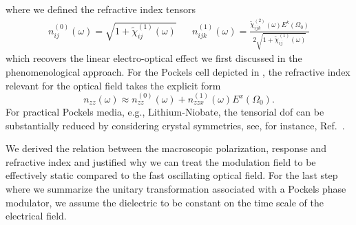 where we defined the refractive index tensors
\begin{align}
	n^{(0)}_{ij}(\omega)
	=
	\sqrt{1+\tilde{\chi}^{(1)}_{ij}(\omega)}
	&&
	n^{(1)}_{ijk}(\omega)
	=
	\frac{\tilde{\chi}^{(2)}_{ijk}(\omega)
	E^k(\Omega_0)}{2\sqrt{1+\tilde{\chi}^{(1)}_{ij}(\omega)}}
\end{align}
which recovers the linear electro-optical effect we first discussed in the phenomenological approach.
For the Pockels cell depicted in , the refractive index relevant for the optical field takes the explicit form
\begin{equation}
	n_{zz}(\omega)
	\approx
	n^{(0)}_{zz}(\omega)
	+
	n^{(1)}_{zzx}(\omega)
	E^x(\Omega_0)
	.
\end{equation}
For practical Pockels media, e.g., Lithium-Niobate, the tensorial \gls{dof} can be substantially reduced by considering crystal symmetries, see, for instance, Ref.~\cite[p.~237]{Yariv1984}.

We derived the relation between the macroscopic polarization, response and refractive index and justified why we can treat the modulation field to be effectively static compared to the fast oscillating optical field.
For the last step where we summarize the unitary transformation associated with a Pockels phase modulator, we assume the dielectric to be constant on the time scale of the electrical field.
